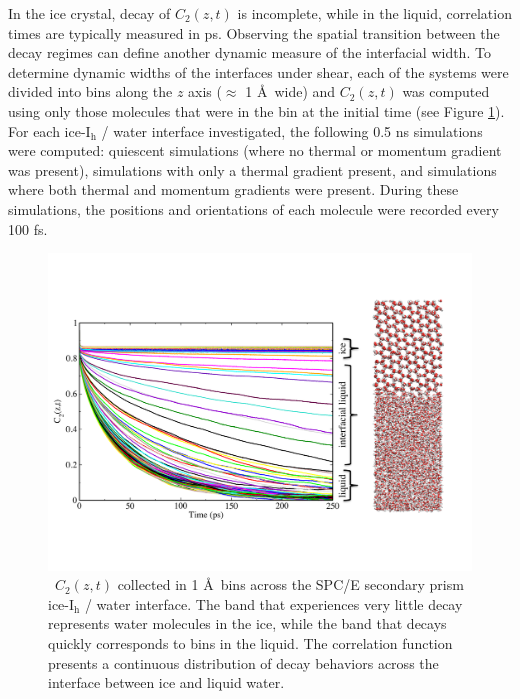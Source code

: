 In the ice crystal, decay of $C_2(z,t)$ is incomplete, while in the
liquid, correlation times are typically measured in ps. Observing the
spatial transition between the decay regimes can define another
dynamic measure of the interfacial width. To determine dynamic widths
of the interfaces under shear, each of the systems were divided into
bins along the $z$ axis ($\approx$ 1 \AA\ wide) and $C_2(z,t)$ was
computed using only those molecules that were in the bin at the
initial time (see Figure \ref{fig:Czt}). For each ice-I$_\mathrm{h}$ /
water interface investigated, the following 0.5 ns simulations were
computed: quiescent simulations (where no thermal or momentum gradient
was present), simulations with only a thermal gradient present, and
simulations where both thermal and momentum gradients were
present. During these simulations, the positions and orientations of
each molecule were recorded every 100 fs.

\begin{figure}
\includegraphics[width=\linewidth]{Figures/CztImage}
\caption{\label{fig:Czt}~$C_2(z,t)$ collected in 1 \AA~bins across the SPC/E
  secondary prism ice-I$_\mathrm{h}$ / water interface. The band that experiences very
  little decay represents water molecules in the ice, while the band
  that decays quickly corresponds to bins in the liquid.  The
  correlation function presents a continuous distribution of decay
  behaviors across the interface between ice and liquid water.}
\end{figure}

